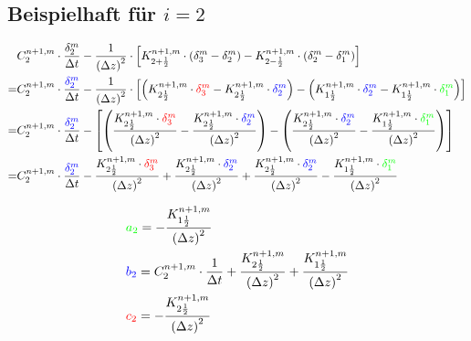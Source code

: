 \documentclass[a4paper,12pt] {article}
\begin{document}
\subsection{Beispielhaft für $i = 2$}

\begin{equation*}
  \begin{split}
    &C_2^{n+1,m} \cdot \frac{\delta_2^m}{\Delta t} - \frac{1}{\left(\Delta z\right)^2} \cdot \left[K_{2+\frac{1}{2}}^{n+1,m} \cdot \left(\delta_3^m - \delta_2^m\right) - K_{2-\frac{1}{2}}^{n+1,m} \cdot \left(\delta_2^m - \delta_1^m\right)\right] \\
    = &C_2^{n+1,m} \cdot \frac{\textcolor{blue}{\delta_2^m}}{\Delta t} - \frac{1}{\left(\Delta z\right)^2} \cdot \left[\left(K_{2\frac{1}{2}}^{n+1,m} \cdot \textcolor{red}{\delta_3^m} - K_{2\frac{1}{2}}^{n+1,m} \cdot \textcolor{blue}{\delta_2^m}\right) - \left(K_{1\frac{1}{2}}^{n+1,m} \cdot \textcolor{blue}{\delta_2^m} - K_{1\frac{1}{2}}^{n+1,m} \cdot \textcolor{green}{\delta_1^m}\right)\right] \\
    = &C_2^{n+1,m} \cdot \frac{\textcolor{blue}{\delta_2^m}}{\Delta t} - \left[\left(\frac{K_{2\frac{1}{2}}^{n+1,m} \cdot \textcolor{red}{\delta_3^m}}{\left(\Delta z\right)^2} - \frac{K_{2\frac{1}{2}}^{n+1,m} \cdot \textcolor{blue}{\delta_2^m}}{\left(\Delta z\right)^2}\right) - \left(\frac{K_{2\frac{1}{2}}^{n+1,m} \cdot \textcolor{blue}{\delta_2^m}}{\left(\Delta z\right)^2} - \frac{K_{1\frac{1}{2}}^{n+1,m} \cdot \textcolor{green}{\delta_1^m}}{\left(\Delta z\right)^2}\right)\right] \\
    = &C_2^{n+1,m} \cdot \frac{\textcolor{blue}{\delta_2^m}}{\Delta t} - \frac{K_{2\frac{1}{2}}^{n+1,m} \cdot \textcolor{red}{\delta_3^m}}{\left(\Delta z\right)^2} + \frac{K_{2\frac{1}{2}}^{n+1,m} \cdot \textcolor{blue}{\delta_2^m}}{\left(\Delta z\right)^2} + \frac{K_{2\frac{1}{2}}^{n+1,m} \cdot \textcolor{blue}{\delta_2^m}}{\left(\Delta z\right)^2} - \frac{K_{1\frac{1}{2}}^{n+1,m} \cdot \textcolor{green}{\delta_1^m}}{\left(\Delta z\right)^2}
  \end{split}
\end{equation*}

\begin{equation*}
  \begin{split}
    &\textcolor{green}{a_2} = - \frac{K_{1\frac{1}{2}}^{n+1,m}}{\left(\Delta z\right)^2} \\
    &\textcolor{blue}{b_2} = C_2^{n+1,m} \cdot \frac{1}{\Delta t} + \frac{K_{2\frac{1}{2}}^{n+1,m}}{\left(\Delta z\right)^2} + \frac{K_{1\frac{1}{2}}^{n+1,m}}{\left(\Delta z\right)^2} \\
    &\textcolor{red}{c_2} = - \frac{K_{2\frac{1}{2}}^{n+1,m}}{\left(\Delta z\right)^2}
  \end{split}
\end{equation*}
\end{document}
